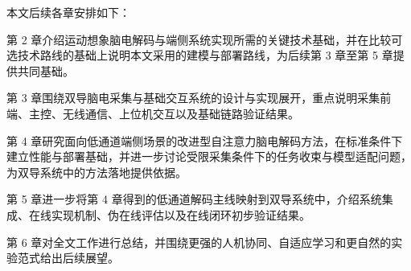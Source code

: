 本文后续各章安排如下：

第 2 章介绍运动想象脑电解码与端侧系统实现所需的关键技术基础，并在比较可选技术路线的基础上说明本文采用的建模与部署路线，为后续第 3 章至第 5 章提供共同基础。

第 3 章围绕双导脑电采集与基础交互系统的设计与实现展开，重点说明采集前端、主控、无线通信、上位机交互以及基础链路验证结果。

第 4 章研究面向低通道端侧场景的改进型自注意力脑电解码方法，在标准条件下建立性能与部署基础，并进一步讨论受限采集条件下的任务收束与模型适配问题，为双导系统中的方法落地提供依据。

第 5 章进一步将第 4 章得到的低通道解码主线映射到双导系统中，介绍系统集成、在线实现机制、伪在线评估以及在线闭环初步验证结果。

第 6 章对全文工作进行总结，并围绕更强的人机协同、自适应学习和更自然的实验范式给出后续展望。
